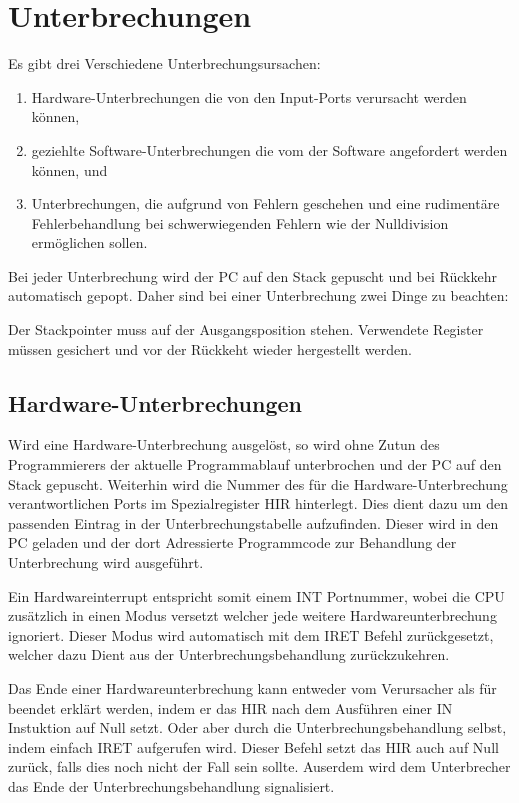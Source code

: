 \section{Unterbrechungen}
\label{sec:Unterbrechungen}

Es gibt drei Verschiedene Unterbrechungsursachen:
\begin{enumerate}
 \item Hardware-Unterbrechungen die von den Input-Ports verursacht werden
       können,
 \item geziehlte Software-Unterbrechungen die vom der Software angefordert
       werden können, und
 \item Unterbrechungen, die aufgrund von Fehlern geschehen und eine rudimentäre
       Fehlerbehandlung bei schwerwiegenden Fehlern wie der Nulldivision
       ermöglichen sollen.
\end{enumerate}

Bei jeder Unterbrechung wird der PC auf den Stack gepuscht und bei Rückkehr
automatisch gepopt. Daher sind bei einer Unterbrechung zwei Dinge zu beachten:

Der Stackpointer muss auf der Ausgangsposition stehen. Verwendete Register
müssen gesichert und vor der Rückkeht wieder hergestellt werden.


\subsection{Hardware-Unterbrechungen}
\label{subsec:Hardware-Unterbrechungen}

Wird eine Hardware-Unterbrechung ausgelöst, so wird ohne Zutun des
Programmierers der aktuelle Programmablauf unterbrochen und der PC auf den Stack
gepuscht. Weiterhin wird die Nummer des für die Hardware-Unterbrechung
verantwortlichen Ports im Spezialregister HIR hinterlegt. Dies dient dazu um den
passenden Eintrag in der Unterbrechungstabelle aufzufinden. Dieser wird in den
PC geladen und der dort Adressierte Programmcode zur Behandlung der
Unterbrechung wird ausgeführt. 

Ein Hardwareinterrupt entspricht somit einem INT Portnummer, wobei die CPU
zusätzlich in einen Modus versetzt welcher jede weitere Hardwareunterbrechung
ignoriert. Dieser Modus wird automatisch mit dem IRET Befehl zurückgesetzt,
welcher dazu Dient aus der Unterbrechungsbehandlung zurückzukehren.

Das Ende einer Hardwareunterbrechung kann entweder vom Verursacher als für
beendet erklärt werden, indem er das HIR nach dem Ausführen einer IN Instuktion
auf Null setzt. Oder aber durch die Unterbrechungsbehandlung selbst, indem
einfach IRET aufgerufen wird. Dieser Befehl setzt das HIR auch auf Null zurück,
falls dies noch nicht der Fall sein sollte. Auserdem wird dem Unterbrecher das
Ende der Unterbrechungsbehandlung signalisiert.

